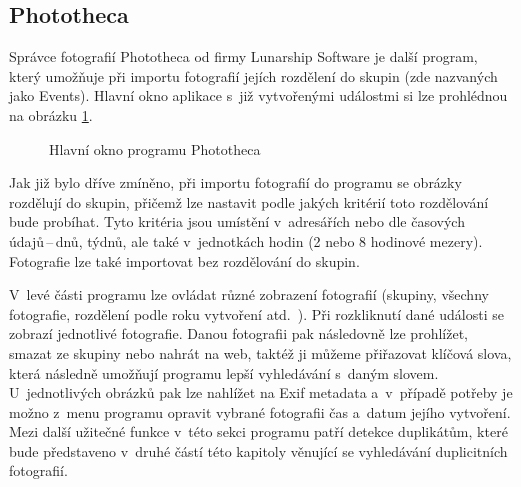\subsection*{Phototheca}

Správce fotografií Phototheca od firmy Lunarship Software \cite{Phototheca} je další program, který umožňuje při importu fotografií jejích rozdělení do skupin (zde nazvaných jako Events). Hlavní okno aplikace s~již vytvořenými událostmi si lze prohlédnou na obrázku \ref{phototh_ob}.

\begin{figure}[h!]
\begin{center}
\caption{Hlavní okno programu Phototheca}
\label{phototh_ob}
\end{center}
\end{figure}

Jak již bylo dříve zmíněno, při importu fotografií do programu se obrázky rozdělují do skupin, přičemž lze nastavit podle jakých kritérií toto rozdělování bude probíhat. Tyto kritéria jsou umístění v~adresářích nebo dle časových údajů\,--\,dnů, týdnů, ale také v~jednotkách hodin (2 nebo 8 hodinové mezery). Fotografie lze také importovat bez rozdělování do skupin. 

V~levé části programu lze ovládat různé zobrazení fotografií (skupiny, všechny fotografie, rozdělení podle roku vytvoření atd.~). Při rozkliknutí dané události se zobrazí jednotlivé fotografie. Danou fotografii pak následovně lze prohlížet, smazat ze skupiny nebo nahrát na web, taktéž ji můžeme přiřazovat klíčová slova, která následně umožňují programu lepší vyhledávání s~daným slovem. U~jednotlivých obrázků pak lze nahlížet na Exif metadata a~v~případě potřeby je možno z~menu programu opravit vybrané fotografii čas a~datum jejího vytvoření.  Mezi další užitečné funkce v~této sekci programu patří detekce duplikátům, které bude představeno v~druhé částí této kapitoly věnující se vyhledávání duplicitních fotografií.

